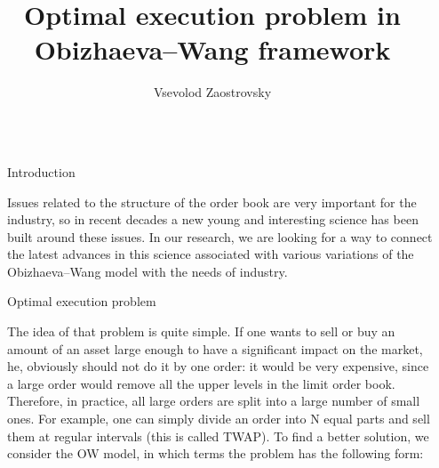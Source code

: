 \documentclass[]{beamer}
\title{Optimal execution problem in Obizhaeva--Wang framework}
\author{Vsevolod Zaostrovsky}
\begin{document}
\nocite{*} %

\begin{frame}[t]
    \begin{columns}[t] %
     
    \begin{column}{\lrmargin}\end{column} %
    
    \begin{column}{\onecolwid} %
     
    
    \begin{block}{Introduction}
    
        Issues related to the structure of the order book are very important for the industry, 
        so in recent decades a new young and interesting science has been built around these issues. In our research, we are looking for a way 
        to connect the latest advances in this science associated with various variations of the Obizhaeva--Wang model with the needs of industry.
    
    \end{block}

    \begin{block}{Optimal execution problem}
    
        The idea of that problem is quite simple. If one wants to sell or buy an amount of an asset large enough to have a significant 
        impact on the market, he, obviously should not do it by one order: it would be very expensive, since a large order 
        would remove all the upper levels in the limit order book. Therefore, in practice, all large orders are split into a large number of small ones. 
        For example, one can simply divide an order into N equal parts and sell them at regular intervals (this is called TWAP). 
        To find a better solution, we consider the OW model, in which terms the problem has the following form: \par  




\end{block}
\end{column}
\end{columns}
\end{frame}
\end{document}
